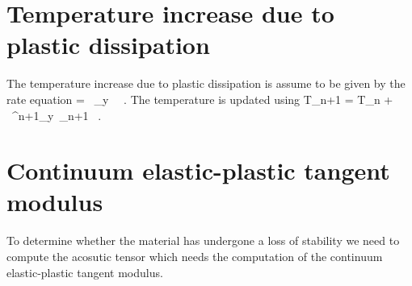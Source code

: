 \section{Temperature increase due to plastic dissipation}
The temperature increase due to plastic dissipation is assume to be
given by the rate equation
\Beq
   = ~\sigma_y~ ~.
\Eeq
The temperature is updated using
\Beq
  T_{n+1} = T_n + 
   ~\sigma^{n+1}_y~_{n+1} ~.
\Eeq

\section{Continuum elastic-plastic tangent modulus}
To determine whether the material has undergone a loss of stability we need to compute
the acosutic tensor which needs the computation of the continuum elastic-plastic tangent
modulus.

